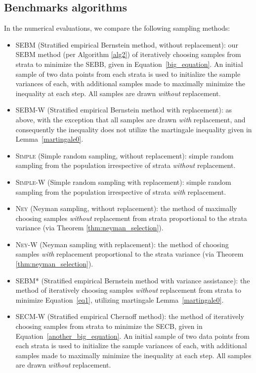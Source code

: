 \subsection{Benchmarks algorithms}
In the numerical evaluations, we compare the following sampling methods:
\begin{itemize}
\item 
\textsc{SEBM} (Stratified empirical Bernstein method, without replacement):
our SEBM method (per Algorithm \ref{alg2}) of iteratively choosing samples from strata to minimize the SEBB, given in Equation~\eqref{big_equation}. 
An initial sample of two data points from each strata is used to initialize the sample variances of each, with additional samples made to maximally minimize the inequality at each step. All samples are drawn \textit{without} replacement.
\item 
\textsc{SEBM-W} (Stratified empirical Bernstein method with replacement): 
as above, with the exception that all samples are drawn \textit{with} replacement, and consequently the inequality does not utilize the martingale inequality given in Lemma~\ref{martingale0}.
\item 
\textsc{Simple} (Simple random sampling, without replacement): simple random sampling from the population irrespective of strata \textit{without} replacement.
\item 
\textsc{Simple-W} (Simple random sampling with replacement): 
simple random sampling from the population irrespective of strata \textit{with} replacement.
\item \textsc{Ney} (Neyman sampling, without replacement): the method of maximally choosing samples \textit{without} replacement from strata proportional to the strata variance (via Theorem \ref{thm:neyman_selection}).
\item \textsc{Ney-W} (Neyman sampling with replacement): the method of choosing samples \textit{with} replacement proportional to the strata variance (via Theorem \ref{thm:neyman_selection}).
\item \textsc{SEBM*} (Stratified empirical Bernstein method with variance assistance): the method of iteratively choosing samples \textit{without} replacement from strata to minimize Equation~\eqref{eq1}, utilizing martingale Lemma~\ref{martingale0}.
\item \textsc{SECM-W} (Stratified empirical Chernoff method): the method of iteratively choosing samples from strata to minimize the SECB, given in Equation~\eqref{another_big_equation}. 
An initial sample of two data points from each strata is used to initialize the sample variances of each, with additional samples made to maximally minimize the inequality at each step. All samples are drawn \textit{without} replacement.

\end{itemize}
